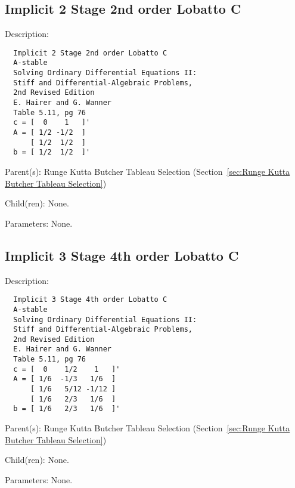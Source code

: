 \subsection{Implicit 2 Stage 2nd order Lobatto C}
\label{sec:Implicit 2 Stage 2nd order Lobatto C}

\begin{list}{}
  {\setlength{\leftmargin}{1.0in}
   \setlength{\labelwidth}{0.75in}
   \setlength{\labelsep}{0.125in}}
  \item[Description:]
\begin{verbatim}
  Implicit 2 Stage 2nd order Lobatto C
  A-stable
  Solving Ordinary Differential Equations II:
  Stiff and Differential-Algebraic Problems,
  2nd Revised Edition
  E. Hairer and G. Wanner
  Table 5.11, pg 76
  c = [  0    1   ]'
  A = [ 1/2 -1/2  ]
      [ 1/2  1/2  ]
  b = [ 1/2  1/2  ]'
\end{verbatim}
  \item[Parent(s):]
    Runge Kutta Butcher Tableau Selection (Section~\ref{sec:Runge Kutta Butcher Tableau Selection})
  \item[Child(ren):]
    None. 
  \item[Parameters:]
    None. 
\end{list}

\subsection{Implicit 3 Stage 4th order Lobatto C}
\label{sec:Implicit 3 Stage 4th order Lobatto C}

\begin{list}{}
  {\setlength{\leftmargin}{1.0in}
   \setlength{\labelwidth}{0.75in}
   \setlength{\labelsep}{0.125in}}
  \item[Description:]
\begin{verbatim}
  Implicit 3 Stage 4th order Lobatto C
  A-stable
  Solving Ordinary Differential Equations II:
  Stiff and Differential-Algebraic Problems,
  2nd Revised Edition
  E. Hairer and G. Wanner
  Table 5.11, pg 76
  c = [  0    1/2    1   ]'
  A = [ 1/6  -1/3   1/6  ]
      [ 1/6   5/12 -1/12 ]
      [ 1/6   2/3   1/6  ]
  b = [ 1/6   2/3   1/6  ]'
\end{verbatim}
  \item[Parent(s):]
    Runge Kutta Butcher Tableau Selection (Section~\ref{sec:Runge Kutta Butcher Tableau Selection})
  \item[Child(ren):]
    None. 
  \item[Parameters:]
    None. 
\end{list}

